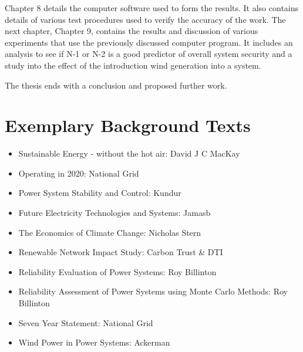 \documentclass[a4paper,oneside,12pt]{report}
\begin{document}
Chapter 8 details the computer software used to form the results. It also contains details of various test procedures used to verify the accuracy of the work.  The next chapter, Chapter 9, contains the results and discussion of various experiments that use the previously discussed computer program. It includes an analysis to see if N-1 or N-2 is a good predictor of overall system security and a study into the effect of the introduction wind generation into a system.

The thesis ends with a conclusion and proposed further work.

\pagebreak
\section{Exemplary Background Texts}

\begin{itemize}
\item Sustainable Energy - without the hot air: David J C MacKay \cite{MacKay2009}
\item Operating in 2020: National Grid \cite{Grid2009}
\item Power System Stability and Control: Kundur \cite{Kundur1994}
\item Future Electricity Technologies and Systems: Jamasb \cite{Jamasb2006}
\item The Economics of Climate Change: Nicholas Stern \cite{Stern2007}
\item Renewable Network Impact Study: Carbon Trust \& DTI \cite{Trust2005}
\item Reliability Evaluation of Power Systems: Roy Billinton \cite{Billinton1996}
\item Reliability Assessment of Power Systems using Monte Carlo Methods: Roy Billinton \cite{Billinton1994}
\item Seven Year Statement: National Grid \cite{Grid2007}
\item Wind Power in Power Systems: Ackerman \cite{Ackermann2005}
\end{itemize}










\end{document}
